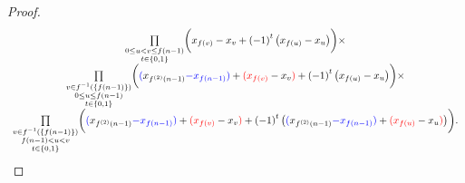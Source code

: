 \begin{proof}
\[\begin{array}{c}
\underset{
    \substack{
        0 \le u < v \le f\left(n-1\right) \\
        t \in \left\{ 0, 1 \right\}
    }
}{\prod}
\bigg( 
    x_{f\left(v\right)} - x_{v} 
    + \left(-1\right)^{t} 
    \big(x_{f\left(u\right)} - x_{u}\big) 
\bigg) \times \\[10pt]

\underset{
    \substack{
        v \in f^{-1}\left(\left\{ f\left(n-1\right)\right\} \right) \\
        0 \le u \le f\left(n-1\right) \\
        t \in \left\{ 0, 1 \right\}
    }
}{\prod}
\bigg(
    {\color{blue}(}x_{f^{\left(2\right)}\left(n-1\right)} 
    {\color{blue}- x_{f\left(n-1\right)}}{\color{blue})} 
    + {\color{red}(x_{f\left(v\right)}} - x_{v}{\color{red})} 
    + \left(-1\right)^{t} 
    \big(x_{f\left(u\right)} - x_{u}\big) 
\bigg) \times \\[10pt]

\underset{
    \substack{
        v \in f^{-1}\left(\left\{ f\left(n-1\right)\right\} \right) \\
        f\left(n-1\right) < u < v \\
        t \in \left\{ 0, 1 \right\}
    }
}{\prod}
\bigg(
    {\color{blue}(}x_{f^{\left(2\right)}\left(n-1\right)} 
    {\color{blue}- x_{f\left(n-1\right)}}{\color{blue})} 
    + {\color{red}(x_{f\left(v\right)}} - x_{v}{\color{red})} 
    + \left(-1\right)^{t} 
    \big(
        {\color{blue}(}x_{f^{\left(2\right)}\left(n-1\right)} 
        {\color{blue}- x_{f\left(n-1\right)}}{\color{blue})} 
        + {\color{red}(x_{f\left(u\right)}} - x_{u}{\color{red})} 
    \big)
\bigg).
\end{array}
\]


\end{proof}
